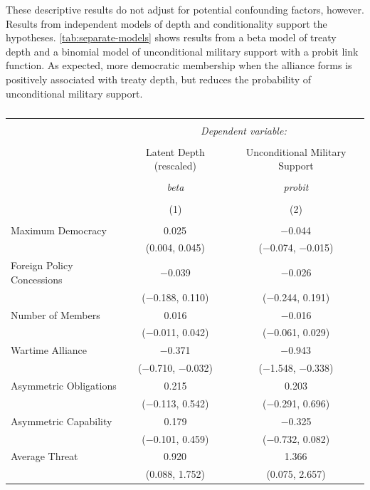 \documentclass[12pt]{article}
\begin{document}
These descriptive results do not adjust for potential confounding factors, however.
Results from independent models of depth and conditionality support the hypotheses. 
\autoref{tab:separate-models} shows results from a beta model of treaty depth and a binomial model of unconditional military support with a probit link function. 
As expected, more democratic membership when the alliance forms is positively associated with treaty depth, but reduces the probability of unconditional military support. 


\begin{table}[!htbp] \centering 
  \caption{} 
  \label{tab:separate-models} 
\begin{tabular}{@{\extracolsep{5pt}}lcc} 
\\[-1.8ex]\hline 
\hline \\[-1.8ex] 
 & \multicolumn{2}{c}{\textit{Dependent variable:}} \\ 
\cline{2-3} 
\\[-1.8ex] & Latent Depth (rescaled) & Unconditional Military Support \\ 
\\[-1.8ex] & \textit{beta} & \textit{probit} \\ 
\\[-1.8ex] & (1) & (2)\\ 
\hline \\[-1.8ex] 
 Maximum Democracy & 0.025$^{}$ & $-$0.044$^{}$ \\ 
  & (0.004, 0.045) & ($-$0.074, $-$0.015) \\ 
  Foreign Policy Concessions & $-$0.039 & $-$0.026 \\ 
  & ($-$0.188, 0.110) & ($-$0.244, 0.191) \\ 
  Number of Members & 0.016 & $-$0.016 \\ 
  & ($-$0.011, 0.042) & ($-$0.061, 0.029) \\ 
  Wartime Alliance & $-$0.371$^{}$ & $-$0.943$^{}$ \\ 
  & ($-$0.710, $-$0.032) & ($-$1.548, $-$0.338) \\ 
  Asymmetric Obligations & 0.215 & 0.203 \\ 
  & ($-$0.113, 0.542) & ($-$0.291, 0.696) \\ 
  Asymmetric Capability & 0.179 & $-$0.325 \\ 
  & ($-$0.101, 0.459) & ($-$0.732, 0.082) \\ 
  Average Threat & 0.920$^{}$ & 1.366$^{}$ \\ 
  & (0.088, 1.752) & (0.075, 2.657) \\ 

\end{tabular}
\end{table}
\end{document}
